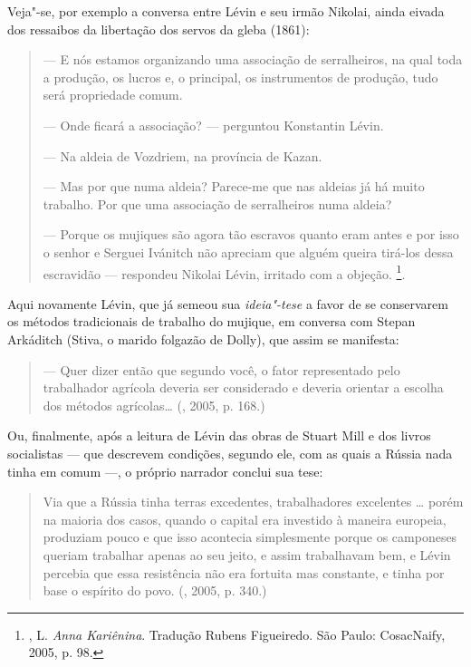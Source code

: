 Veja"-se, por exemplo a conversa entre Lévin e seu irmão Nikolai, ainda
eivada dos ressaibos da libertação dos servos da gleba (1861):

\begin{quote}
--- E nós estamos organizando uma associação de serralheiros, na qual toda a produção, os
lucros e, o principal, os instrumentos de produção, tudo será propriedade comum.

\noindent --- Onde ficará a associação? --- perguntou Konstantin Lévin.

\noindent --- Na aldeia de Vozdriem, na província de Kazan.

\noindent --- Mas por que numa aldeia? Parece-me que nas aldeias
já há muito trabalho. Por que uma associação de serralheiros numa aldeia?

\noindent --- Porque os mujiques são agora tão escravos quanto
eram antes e por isso o senhor e Serguei Ivánitch não apreciam
que alguém queira tirá-los dessa escravidão --- respondeu Nikolai
Lévin, irritado com a objeção. \footnote{, L. \emph{Anna Kariênina}. Tradução Rubens Figueiredo. São Paulo: CosacNaify, 2005, p. 98.}.
\end{quote}

Aqui novamente Lévin, que já semeou sua \emph{ideia"-tese} a
favor de se conservarem os métodos tradicionais de trabalho do
mujique, em conversa com Stepan Arkáditch (Stiva, o marido folgazão de
Dolly), que assim se manifesta:

\begin{quote}
--- Quer dizer então que segundo você, o fator representado pelo
trabalhador agrícola deveria ser considerado e deveria orientar a
escolha dos métodos agrícolas\ldots{} (, 2005, p. 168.)
\end{quote}

Ou, finalmente, após a leitura de Lévin das obras de Stuart Mill e dos livros
socialistas --- que descrevem condições, segundo ele, com as
quais a Rússia nada tinha em comum ---, o próprio
narrador conclui sua tese:

\begin{quote}
Via que a Rússia tinha terras excedentes, trabalhadores excelentes \ldots{}
porém na maioria dos casos, quando o capital era investido à maneira
europeia, produziam pouco e que isso
acontecia simplesmente porque os camponeses queriam trabalhar apenas ao
seu jeito, e assim trabalhavam bem, e Lévin percebia que essa
resistência não era fortuita mas constante, e tinha por base o espírito
do povo. (, 2005, p. 340.)
\end{quote}

